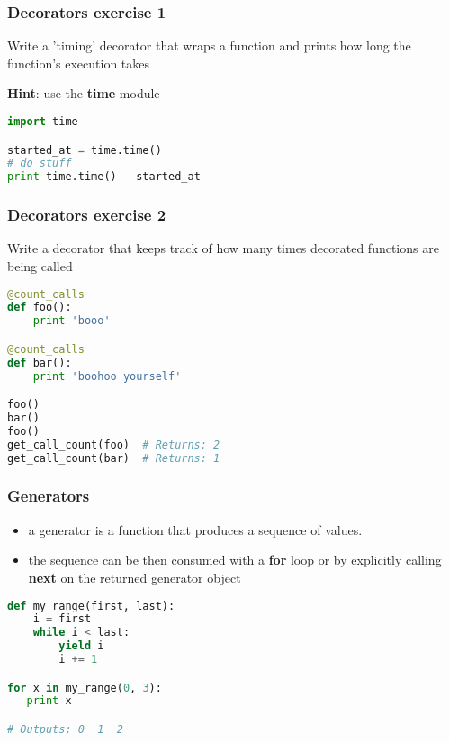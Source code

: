 \documentclass{beamer}
\begin{document}
\begin{frame}[fragile]
\frametitle{Decorators exercise 1}
Write a 'timing' decorator that wraps a function and prints how long the function's execution takes

\vspace{15 mm}
{\bf Hint}: use the {\bf time} module
\vspace{5 mm}
\begin{lstlisting}[language=python]
import time

started_at = time.time()
# do stuff
print time.time() - started_at
\end{lstlisting}
\end{frame}

\begin{frame}[fragile]
\frametitle{Decorators exercise 2}

Write a decorator that keeps track of how many times decorated functions are being called

\vspace{5 mm}

\begin{lstlisting}[language=python]
@count_calls
def foo():
    print 'booo'

@count_calls
def bar():
    print 'boohoo yourself'

foo()
bar()
foo()
get_call_count(foo)  # Returns: 2
get_call_count(bar)  # Returns: 1
\end{lstlisting}

\end{frame}


\begin{frame}[fragile]
\frametitle{Generators}
\begin{itemize}
  \item a generator is a function that produces a sequence of values.
  \item the sequence can be then consumed with a {\bf for} loop or by explicitly
    calling {\bf next} on the returned generator object
\end{itemize}
\vspace{5 mm}
\pause
\begin{lstlisting}[language=python]
def my_range(first, last):
    i = first
    while i < last:
        yield i
        i += 1

for x in my_range(0, 3):
   print x

# Outputs: 0  1  2
\end{lstlisting}
\end{frame}
\end{document}
